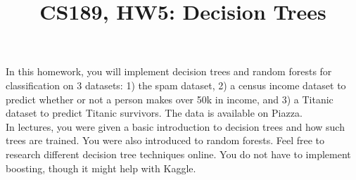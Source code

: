 \documentclass{article}
\title{CS189, HW5: Decision Trees}
\begin{document}
\maketitle

\noindent In this homework, you will implement decision trees and random forests for classification on 3 datasets: 1) the spam dataset, 2) a census income dataset to predict whether or not a person makes over 50k in income, and 3) a Titanic dataset to predict Titanic survivors. The data is available on Piazza. \\

\noindent In lectures, you were given a basic introduction to decision trees and how such trees are trained. You were also introduced to random forests. Feel free to research different decision tree techniques online. You do not have to implement boosting, though it might help with Kaggle.
\end{document}
